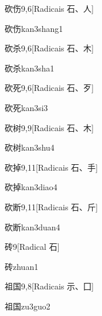 \begin{entry}{砍伤}{9,6}[Radicais ⽯、⼈]
  \begin{phonetics}{砍伤}{kan3shang1}
  \end{phonetics}
\end{entry}

\begin{entry}{砍杀}{9,6}[Radicais ⽯、⽊]
  \begin{phonetics}{砍杀}{kan3sha1}
  \end{phonetics}
\end{entry}

\begin{entry}{砍死}{9,6}[Radicais ⽯、⽍]
  \begin{phonetics}{砍死}{kan3si3}
  \end{phonetics}
\end{entry}

\begin{entry}{砍树}{9,9}[Radicais ⽯、⽊]
  \begin{phonetics}{砍树}{kan3shu4}
  \end{phonetics}
\end{entry}

\begin{entry}{砍掉}{9,11}[Radicais ⽯、⼿]
  \begin{phonetics}{砍掉}{kan3diao4}
  \end{phonetics}
\end{entry}

\begin{entry}{砍断}{9,11}[Radicais ⽯、⽄]
  \begin{phonetics}{砍断}{kan3duan4}
  \end{phonetics}
\end{entry}

\begin{entry}{砖}{9}[Radical ⽯]
  \begin{phonetics}{砖}{zhuan1}
  \end{phonetics}
\end{entry}

\begin{entry}{祖国}{9,8}[Radicais ⽰、⼞]
  \begin{phonetics}{祖国}{zu3guo2}
  \end{phonetics}
\end{entry}

